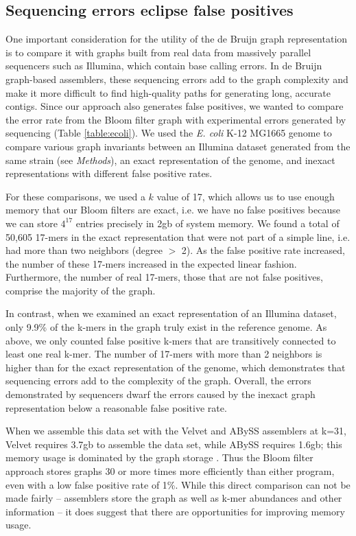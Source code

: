 \documentclass{pnastwo}
\begin{document}
\begin{article}
\subsection{Sequencing errors eclipse false positives}

One important consideration for the utility of the de Bruijn graph
representation is to compare it with graphs built from real data from
massively parallel sequencers such as Illumina, which contain base
calling errors.  In de Bruijn graph-based assemblers, these sequencing
errors add to the graph complexity and make it more difficult to find
high-quality paths for generating long, accurate contigs. Since our
approach also generates false positives, we wanted to compare the
error rate from the Bloom filter graph with experimental errors
generated by sequencing (Table \ref{table:ecoli}). We used the \emph{E. coli} K-12
MG1665 genome to compare various graph invariants between an Illumina
dataset generated from the same strain (see \emph{Methods}), an exact
representation of the genome, and inexact representations with
different false positive rates.

For these comparisons, we used a $k$ value of 17, which allows us to
use enough memory that our Bloom filters are exact, i.e. we have no
false positives because we can store $4^{17}$ entries precisely in
2gb of system memory.
We found a
total of 50,605 17-mers in the exact representation that were not part
of a simple line, i.e. had more than two neighbors (degree $>$ 2). As
the false positive rate increased, the number of these 17-mers
increased in the expected linear fashion.
Furthermore, the
number of real 17-mers, those that are not false positives,
comprise the majority of the graph.

In contrast, when we examined an exact representation of an Illumina
dataset, only 9.9\% of the k-mers in the graph truly exist in the
reference genome.  As above, we only counted false positive k-mers
that are transitively connected to least one real k-mer. The number of
17-mers with more than 2 neighbors is higher than for the exact
representation of the genome, which demonstrates that sequencing
errors add to the complexity of the graph. Overall, the
errors demonstrated by sequencers dwarf the errors caused by the
inexact graph representation below a reasonable false positive rate.

When we assemble this data set with the Velvet and ABySS assemblers at
k=31, Velvet requires 3.7gb to assemble the data set,
while ABySS requires 1.6gb; this memory usage is dominated by the
graph storage \cite{zerbinothesis}. Thus the Bloom filter approach stores graphs 30 or
more times more efficiently than either program, even with a low false
positive rate of 1\%.  While this direct comparison can not be made fairly -- assemblers store the graph as well as k-mer abundances and other information -- it does suggest that there are opportunities for improving memory usage.


\end{article}
\end{document}
